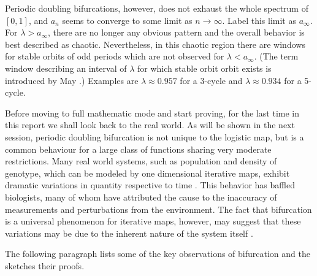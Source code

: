 Periodic doubling bifurcations, however, does not exhaust the whole spectrum of $[0,1]$, and $a_{n}$ seems to converge to some limit as $n \rightarrow \infty$. 
Label this limit as $a_{\infty}$.
For $\lambda > a_{\infty}$, there are no longer any obvious pattern and the overall behavior is best described as chaotic. 
Nevertheless, in this chaotic region there are windows for stable orbits of odd periods which are not observed for $\lambda < a_{\infty}$. (The term window describing an interval of $\lambda$ for which stable orbit orbit exists is introduced by May \cite{May_Nature}.)
Examples are $\lambda \approx 0.957$ for a 3-cycle and $\lambda \approx 0.934$ for a 5-cycle.

Before moving to full mathematic mode and start proving, for the last time in this report we shall look back to the real world. 
As will be shown in the next session, periodic doubling bifurcation is not unique to the logistic map, but is a common behaviour for a large class of functions sharing very moderate restrictions. 
Many real world systems, such as population and density of genotype, which can be modeled by one dimensional iterative maps, exhibit dramatic variations in quantity respective to time \cite{colorado_potato_beetle}.
This behavior has baffled biologists, many of whom have attributed the cause to the inaccuracy of measurements and perturbations from the environment. 
The fact that bifurcation is a universal phenomenon for iterative maps, however, may suggest that these variations may be due to the inherent nature of the system itself \cite{genotype}.


The following paragraph lists some of the key observations of bifurcation and the sketches their proofs.

